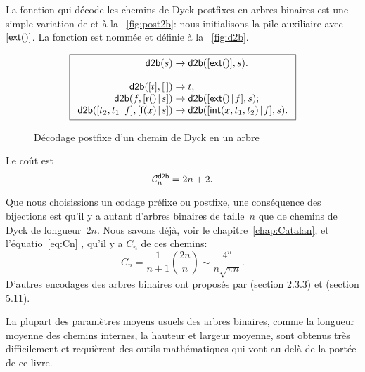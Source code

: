 La fonction qui décode les chemins de Dyck
postfixes en arbres binaires est une simple variation de
 et
 à la
\fig~\vref{fig:post2b}: nous initialisons la pile auxiliaire avec
\([\textsf{ext}()]\). La fonction est nommée
 et définie à la
\fig~\vref{fig:d2b}.
\begin{figure}
\begin{equation*}
\boxed{
\begin{array}{r@{\;}c@{\;}l}
\fun{d2b}(s) & \rightarrow & \fun{d2b}([\fun{ext}()],s).\\
\\
\fun{d2b}([t],\el) & \rightarrow & t;\\
\fun{d2b}(f,\cons{\fun{r}()}{s}) & \rightarrow & \fun{d2b}(\cons{\fun{ext}()}{f},s);\\
\fun{d2b}(\cons{t_2,t_1}{f},\cons{\fun{f}(x)}{s}) & \rightarrow & \fun{d2b}(\cons{\fun{int}(x,t_1,t_2)}{f},s).
\end{array}}
\end{equation*}
\caption{Décodage postfixe d'un chemin de Dyck en un arbre}
\label{fig:d2b}
\end{figure}
Le coût est
\begin{equation*}
  \C{\fun{d2b}}{n} = 2n + 2.
  \index{d2b@$\C{\fun{d2b}}{n}$}
\end{equation*}

Que nous choisissions un codage préfixe ou postfixe, une conséquence
des bijections est qu'il y a autant d'arbres binaires de taille~\(n\)
que de chemins de Dyck de longueur~\(2n\). Nous savons déjà, voir le chapitre~\ref{chap:Catalan}, et l'équatio~\eqref{eq:Cn}
, qu'il y a \(C_n\) de ces chemins:
\begin{equation*}
  C_n = \frac{1}{n+1}\binom{2n}{n} \sim \frac{4^n}{n\sqrt{\pi n}}.
\end{equation*}
D'autres encodages des arbres binaires ont proposés par
\cite{Knuth_1997} (section 2.3.3) et \cite{SedgewickFlajolet_1996}
(section 5.11).



La plupart des paramètres moyens usuels des arbres binaires, comme la
longueur moyenne des chemins internes, la hauteur et largeur moyenne,
sont obtenus très difficilement et requièrent des outils mathématiques
qui vont au-delà de la portée de ce livre.

